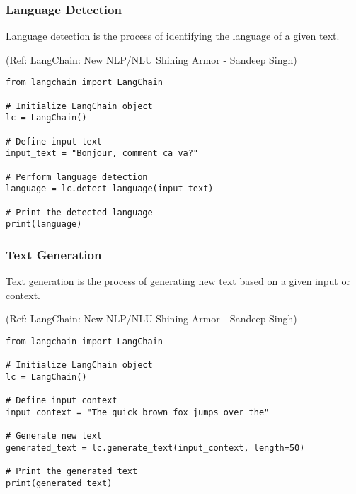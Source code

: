 \begin{frame}[fragile]\frametitle{Language Detection}

Language detection is the process of identifying the language of a given text.

{\tiny (Ref: LangChain: New NLP/NLU Shining Armor - Sandeep Singh)}

\begin{lstlisting}
from langchain import LangChain

# Initialize LangChain object
lc = LangChain()

# Define input text
input_text = "Bonjour, comment ca va?"

# Perform language detection
language = lc.detect_language(input_text)

# Print the detected language
print(language)
\end{lstlisting}	  

\end{frame}

\begin{frame}[fragile]\frametitle{Text Generation}

Text generation is the process of generating new text based on a given input or context. 

{\tiny (Ref: LangChain: New NLP/NLU Shining Armor - Sandeep Singh)}

\begin{lstlisting}
from langchain import LangChain

# Initialize LangChain object
lc = LangChain()

# Define input context
input_context = "The quick brown fox jumps over the"

# Generate new text
generated_text = lc.generate_text(input_context, length=50)

# Print the generated text
print(generated_text)
\end{lstlisting}	  

\end{frame}


